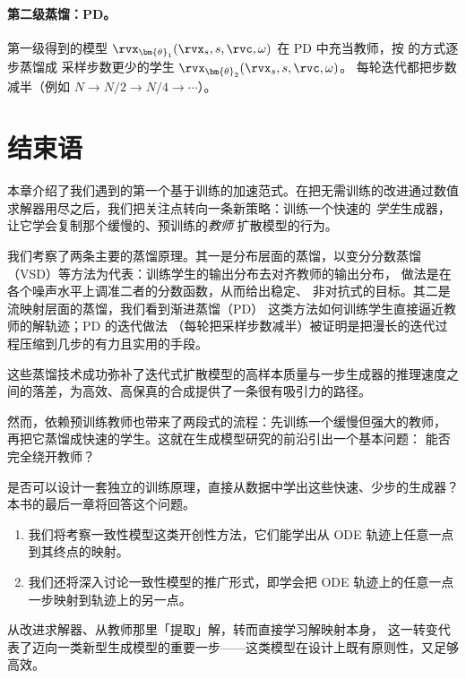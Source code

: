 \paragraph{第二级蒸馏：PD。}
第一级得到的模型 $\rvx_{\bm{\theta}_1}(\rvx_s, s, \rvc, \omega)$
在 PD 中充当教师，按  的方式逐步蒸馏成
采样步数更少的学生 $\rvx_{\bm{\theta}_2}(\rvx_s, s, \rvc, \omega)$。
每轮迭代都把步数减半（例如 $N \to N/2 \to N/4 \to \cdots$）。

\section{结束语}\label{sec:ch10_cr}

本章介绍了我们遇到的第一个基于训练的加速范式。在把无需训练的改进通过数值求解器用尽之后，我们把关注点转向一条新策略：训练一个快速的
\textit{学生}生成器，让它学会复制那个缓慢的、预训练的\textit{教师}
扩散模型的行为。

我们考察了两条主要的蒸馏原理。其一是分布层面的蒸馏，以变分分数蒸馏
（VSD）等方法为代表：训练学生的输出分布去对齐教师的输出分布，
做法是在各个噪声水平上调准二者的分数函数，从而给出稳定、
非对抗式的目标。其二是流映射层面的蒸馏，我们看到渐进蒸馏（PD）
这类方法如何训练学生直接逼近教师的解轨迹；PD 的迭代做法
（每轮把采样步数减半）被证明是把漫长的迭代过程压缩到几步的有力且实用的手段。

这些蒸馏技术成功弥补了迭代式扩散模型的高样本质量与一步生成器的推理速度之间的落差，为高效、高保真的合成提供了一条很有吸引力的路径。

然而，依赖预训练教师也带来了两段式的流程：先训练一个缓慢但强大的教师，
再把它蒸馏成快速的学生。这就在生成模型研究的前沿引出一个基本问题：
能否完全绕开教师？

是否可以设计一套独立的训练原理，直接从数据中学出这些快速、少步的生成器？
本书的最后一章将回答这个问题。
\begin{enumerate}
    \item 我们将考察一致性模型这类开创性方法，它们能学出从 ODE 轨迹上任意一点到其终点的映射。
    \item 我们还将深入讨论一致性模型的推广形式，即学会把 ODE 轨迹上的任意一点一步映射到轨迹上的另一点。
\end{enumerate}
从改进求解器、从教师那里「提取」解，转而直接学习解映射本身，
这一转变代表了迈向一类新型生成模型的重要一步——这类模型在设计上既有原则性，又足够高效。
